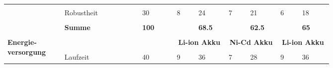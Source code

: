 \documentclass[main.tex]{subfiles} %
\begin{document}
\begin{landscape}
\begin{table}[ht]
\begin{tabular}{|p{0.11\linewidth}|p{0.18\linewidth}|p{0.085\linewidth}|p{0.057\linewidth}|p{0.07\linewidth}|p{0.057\linewidth}|p{0.07\linewidth}|p{0.057\linewidth}|p{0.07\linewidth}|}
            \cline{2-9}
                                                           &                                     &                                            &                                             &                                             &   &               &   &             \\[-9pt]
                                                           & Robustheit                          & 30                                         & 8                                           & 24                                          & 7 & 21            & 6 & 18          \\[1pt]
            \cline{2-9}
                                                           &                                     &                                            &                                             &                                             &   &               &   &             \\[-9pt]
                                                           & \textbf{Summe}                      & \textbf{100}                               &                                             & \textbf{68.5}                               &   & \textbf{62.5} &   & \textbf{65} \\[1pt]
            \hline
            \hline
                                                           & \multicolumn{2}{c|}{}               & \multicolumn{2}{c|}{}                      & \multicolumn{2}{c|}{}                       & \multicolumn{2}{c|}{}                                                             \\[-9pt]
            \multirow{4}{4em}{\textbf{Energie-versorgung}} & \multicolumn{2}{c|}{}               & \multicolumn{2}{c|}{\textbf{Li-ion Akku}}  & \multicolumn{2}{c|}{\textbf{Ni-Cd Akku}}    & \multicolumn{2}{c|}{\textbf{Li-ion Akku}}                                         \\[1pt]
            \cline{2-9}
                                                           &                                     &                                            &                                             &                                             &   &               &   &             \\[-9pt]
                                                           & Laufzeit                            & 40                                         & 9                                           & 36                                          & 7 & 28            & 9 & 36          \\[1pt]

\end{tabular}
\end{table}
\end{landscape}
\end{document}
